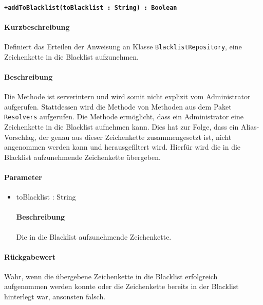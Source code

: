 \paragraph*{\texttt{+addToBlacklist(toBlacklist : String) : Boolean}}%
\paragraph*{Kurzbeschreibung}
Definiert das Erteilen der Anweisung an Klasse \texttt{BlacklistRepository}, eine Zeichenkette in die Blacklist aufzunehmen.
\paragraph*{Beschreibung}
Die Methode ist serverintern und wird somit nicht explizit vom Administrator aufgerufen.
Stattdessen wird die Methode von Methoden aus dem Paket \texttt{Resolvers} aufgerufen.
Die Methode ermöglicht, dass ein Administrator eine Zeichenkette in die Blacklist aufnehmen kann.
Dies hat zur Folge, dass ein Alias-Vorschlag, der genau aus dieser Zeichenkette zusammengesetzt ist, nicht angenommen werden kann und herausgefiltert wird.
Hierfür wird die in die Blacklist aufzunehmende Zeichenkette übergeben.
\paragraph*{Parameter}
\begin{itemize}
    \item toBlacklist : String
    		\paragraph*{Beschreibung}
    		Die in die Blacklist aufzunehmende Zeichenkette.
\end{itemize}
\paragraph*{Rückgabewert}
Wahr, wenn die übergebene Zeichenkette in die Blacklist erfolgreich aufgenommen werden konnte oder die Zeichenkette bereits in der Blacklist hinterlegt war, ansonsten falsch.
